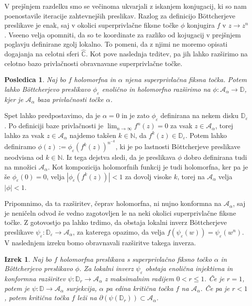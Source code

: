 \documentclass[12pt,a4paper]{amsart}
\theoremstyle{definition} %
\theoremstyle{plain} %
\newtheorem{izrek}[definicija]{Izrek}
\newtheorem{posledica}[definicija]{Posledica}
\newcommand{\N}{\mathbb N}
\newcommand{\CC}{\mathbb C}
\newcommand{\CCinf} {\hat{\CC}} %
\newcommand{\D}{\mathbb D} %
\newcommand{\A}{\mathscr A} %
\begin{document}
V prejšnjem razdelku smo se večinoma ukvarjali z iskanjem konjugacij, ki so nam poenostavile iteracije zahtevnejših preslikav.
Razlog za definicijo B{\"o}ttcherjeve preslikave je enak, saj v okolici superprivlačne fiksne točke
$\phi$ konjugira $f$ v $z \to z^n$.
Vseeno velja opomniti, da so te koordinate za razliko od kojugacij v prejšnjem poglavju definirane zgolj lokalno. 
To pomeni, da z njimi ne moremo opisati dogajanja na celotni sferi $\CCinf$.
Kot pove naslednja trditev, pa jih lahko razširimo na celotno bazo privlačnosti obravnavane superprivlačne točke.

\begin{posledica}\label{pos:expBottcher}
Naj bo $f$ holomorfna in $\alpha$ njena superprivlačna fiksna točka.
Potem lahko B{\"o}ttcherjevo preslikavo $\phi_\varepsilon$ enolično in holomorfno razširimo na $\phi \colon \A_\alpha \to \D$, 
kjer je $\A_\alpha$ baza privlačnosti točke $\alpha$.
\end{posledica}

\proof
Spet lahko predpostavimo, da je $\alpha = 0$ in je zato $\phi_\varepsilon$ definirana na nekem disku $\D_\varepsilon$.
Po definiciji baze privlačnosti je $\lim_{n\to\infty}f^n(z) = 0$ za vsak $z \in \A_\alpha$, torej lahko za vsak $z\in\A_\alpha$ 
najdemo takšen $k\in\N$, da $f^k(z) \in \D_\varepsilon$. Potem lahko definiramo $\phi(z) := \phi_\varepsilon(f^k(z))^{n^{-k}}$,
ki je po lastnosti B{\"o}ttcherjeve preslikave neodvisna od $k\in\N$. 
Iz tega dejstva sledi, da je preslikava $\phi$ dobro definirana tudi na množici $\A_\alpha$.
Kot kompozicija holomorfnih funkcij je tudi holomorfna, 
ker pa je še $\phi_\varepsilon(0) = 0$, velja $|\phi_\varepsilon(f^k(z))| < 1$ za dovolj visoke $k$, 
torej na $\A_\alpha$ velja $|\phi| < 1$.
\endproof

Pripomnimo, da ta razširitev, čeprav holomorfna, ni nujno konformna na $\A_\alpha$, saj je neničeln odvod še vedno
zagotovljen le na neki okolici superprivlačne fiksne točke.
Z gotovostjo pa lahko trdimo, da obstaja lokalni inverz B{\"o}ttcherjeve preslikave $\psi_\varepsilon \colon \D_\varepsilon \to \A_\alpha$, 
za katerega opazimo, da velja $f(\psi_\varepsilon(w)) = \psi_\varepsilon(w^n)$.
V naslednjem izreku bomo obravnavali razširitve takega inverza.

\begin{izrek}\label{izr:invBottcher}
Naj bo $f$ holomorfna preslikava s superprivlačno fiksno točko $\alpha$ in B{\"o}ttcherjevo preslikavo $\phi$.
Za lokalni inverz $\psi_\varepsilon$ obstaja enolična injektivna in konformna razširitev $\psi \colon \D_r \to \A_\alpha$ z maksimalnim radijem $0 < r \leq 1$.
Če je $r = 1$, potem je $\psi \colon \D \to \A_\alpha$ surjekcija, $\alpha$ pa edina kritična točka $f$ na $\A_\alpha$.
Če pa je $r < 1$, potem kritična točka $f$ leži na $\partial(\psi(\D_r)) \subset \A_\alpha$.
\end{izrek}
\end{document}
